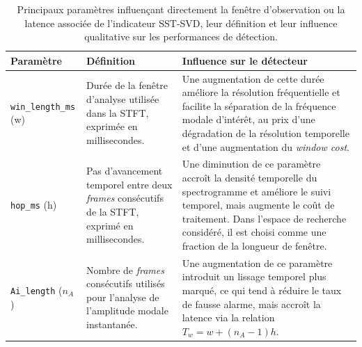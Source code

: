 \documentclass[12pt,a4paper, openany]{book}
\begin{document}
\begin{table}[h]
\centering
\caption{Principaux paramètres influençant directement la fenêtre d'observation ou la latence associée de l'indicateur SST-SVD, leur définition et leur influence qualitative sur les performances de détection.}
\label{tab:sst_svd_parameters_2}
\begin{tabularx}{\textwidth}{|l|>{\raggedright\arraybackslash}X|>{\raggedright\arraybackslash}X|}
\hline
\textbf{Paramètre} & \textbf{Définition} & \textbf{Influence sur le détecteur} \\
\hline
\texttt{win\_length\_ms} (w) & Durée de la fenêtre d'analyse utilisée dans la STFT, exprimée en millisecondes. & Une augmentation de cette durée améliore la résolution fréquentielle et facilite la séparation de la fréquence modale d'intérêt, au prix d'une dégradation de la résolution temporelle et d'une augmentation du \textit{window cost}. \\
\hline
\texttt{hop\_ms} (h) & Pas d'avancement temporel entre deux \textit{frames} consécutifs de la STFT, exprimé en millisecondes. & Une diminution de ce paramètre accroît la densité temporelle du spectrogramme et améliore le suivi temporel, mais augmente le coût de traitement. Dans l'espace de recherche considéré, il est choisi comme une fraction de la longueur de fenêtre. \\
\hline
\texttt{Ai\_length} ($n_A$) & Nombre de \textit{frames} consécutifs utilisés pour l'analyse de l'amplitude modale instantanée. & Une augmentation de ce paramètre introduit un lissage temporel plus marqué, ce qui tend à réduire le taux de fausse alarme, mais accroît la latence via la relation $T_w = w + (n_A-1)h$. \\
\hline
\end{tabularx}
\end{table}
\end{document}
